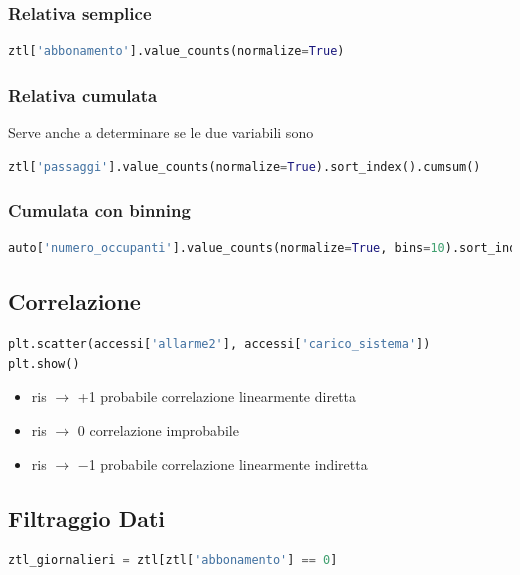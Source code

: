 \documentclass{article}
\begin{document}
\subsubsection*{Relativa semplice}
\begin{lstlisting}[language=Python]
ztl['abbonamento'].value_counts(normalize=True)
\end{lstlisting}

\subsubsection*{Relativa cumulata}

Serve anche a determinare se le due variabili sono 
\begin{lstlisting}[language=Python]
ztl['passaggi'].value_counts(normalize=True).sort_index().cumsum()
\end{lstlisting}

\subsubsection*{Cumulata con binning}
\begin{lstlisting}[language=Python]
auto['numero_occupanti'].value_counts(normalize=True, bins=10).sort_index().cumsum()
\end{lstlisting}

\subsection*{Correlazione}

\begin{lstlisting}[language=Python]
plt.scatter(accessi['allarme2'], accessi['carico_sistema'])
plt.show()
\end{lstlisting}


\begin{itemize}
    \item ris $\to$ +1 probabile correlazione linearmente diretta
    \item ris $\to$ 0 correlazione improbabile
    \item ris $\to$ −1 probabile correlazione linearmente indiretta
\end{itemize}

\subsection*{Filtraggio Dati}

\begin{lstlisting}[language=Python]
    ztl_giornalieri = ztl[ztl['abbonamento'] == 0]
\end{lstlisting}
\end{document}
